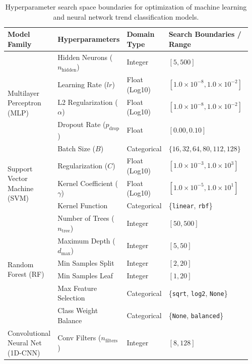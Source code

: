 
\begin{table}[htbp]
\caption{Hyperparameter search space boundaries for optimization of machine learning and neural network trend classification models.}
\label{tab:search_space}
\centering
\small
\setlength{\tabcolsep}{3pt}
\begin{tabularx}{\textwidth}{@{}p{0.18\linewidth} p{0.22\linewidth} p{0.14\linewidth} p{0.42\linewidth}@{}}
\toprule
Model Family & Hyperparameters & Domain Type & Search Boundaries / Range \\
\midrule
\multirow{5}{*}{Multilayer Perceptron (MLP)} 
  & Hidden Neurons ($n_{\text{hidden}}$) & Integer & $[5, 500]$ \\
  & Learning Rate ($lr$) & Float (Log10) & $[1.0 \times 10^{-8}, 1.0 \times 10^{-2}]$ \\
  & L2 Regularization ($\alpha$) & Float (Log10) & $[1.0 \times 10^{-8}, 1.0 \times 10^{-2}]$ \\
  & Dropout Rate ($p_{\text{drop}}$) & Float & $[0.00, 0.10]$ \\
  & Batch Size ($B$) & Categorical & $\{16, 32, 64, 80, 112, 128\}$ \\
\midrule
\multirow{3}{*}{Support Vector Machine (SVM)} 
  & Regularization ($C$) & Float (Log10) & $[1.0 \times 10^{-3}, 1.0 \times 10^{3}]$ \\
  & Kernel Coefficient ($\gamma$) & Float (Log10) & $[1.0 \times 10^{-5}, 1.0 \times 10^{1}]$ \\
  & Kernel Function & Categorical & \{\texttt{linear}, \texttt{rbf}\} \\
\midrule
\multirow{6}{*}{Random Forest (RF)} 
  & Number of Trees ($n_{\text{tree}}$) & Integer & $[50, 500]$ \\
  & Maximum Depth ($d_{\text{max}}$) & Integer & $[5, 50]$ \\
  & Min Samples Split & Integer & $[2, 20]$ \\
  & Min Samples Leaf & Integer & $[1, 20]$ \\
  & Max Feature Selection & Categorical & \{\texttt{sqrt}, \texttt{log2}, \texttt{None}\} \\
  & Class Weight Balance & Categorical & \{\texttt{None}, \texttt{balanced}\} \\
\midrule
\multirow{7}{*}{Convolutional Neural Net (1D-CNN)} 
  & Conv Filters ($n_{\text{filters}}$) & Integer & $[8, 128]$ \\

\end{tabularx}
\end{table}
